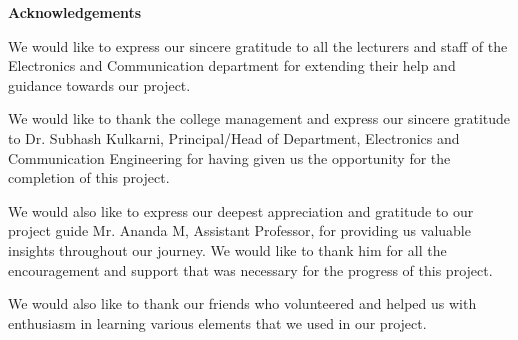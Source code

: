 \begin{center}
\thispagestyle{empty}
\LARGE{\textbf{Acknowledgements}}\\[1cm]
\end{center}
\linespread{1.13}

We would like to express our sincere gratitude to all the lecturers and staff of the Electronics and Communication department for extending their help and guidance towards our project.
\newline

We would like to thank the college management and express our sincere gratitude to Dr. Subhash Kulkarni, Principal/Head of Department, Electronics and Communication Engineering for having given us the opportunity for the completion of this project.
\newline

We would also like to express our deepest appreciation and gratitude to our project guide Mr. Ananda M, Assistant Professor, for providing us valuable insights throughout our journey. We would like to thank him for all the encouragement and support that was necessary for the progress of this project.
\newline

We would also like to thank our friends who volunteered and helped us with enthusiasm in learning various elements that we used in our project. 